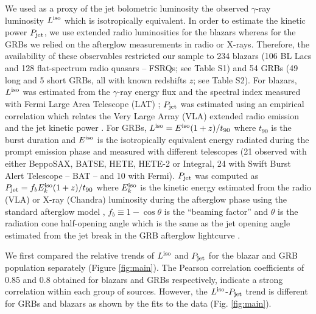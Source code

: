 \documentclass[12pt]{article}
\begin{document}
We used as a proxy of the jet bolometric luminosity the observed $\gamma$-ray luminosity $L^{\rm iso}$ which is isotropically equivalent. In order to estimate the kinetic power $P_{\rm jet}$, we use extended radio luminosities for the blazars whereas for the GRBs we relied on the afterglow measurements in radio or X-rays. Therefore, the availability of these observables restricted our sample to 234 blazars (106 BL Lacs and 128 flat-spectrum radio quasars -- FSRQs; see Table S1) and 54 GRBs (49 long and 5 short GRBs, all with known redshifts $z$; see Table S2). 
For blazars, $L^{\rm iso}$ was estimated from the $\gamma$-ray energy flux and the spectral index measured with Fermi Large Area Telescope (LAT) \cite{2lac}; $P_{\rm jet}$ was estimated using an empirical correlation which relates the Very Large Array (VLA) extended radio emission and the jet kinetic power \cite{cava10,meyer11}. 
For GRBs, $L^{\rm iso} = E^{\rm iso}(1+z)/t_{90}$ where $t_{90}$ is the burst duration and $E^{\rm iso}$ is the isotropically equivalent energy radiated during the prompt emission phase and measured with different telescopes (21 observed with either BeppoSAX, BATSE, HETE, HETE-2 or Integral, 24 with Swift Burst Alert Telescope -- BAT -- and 10 with Fermi). $P_{\rm jet}$ was computed as $P_{\rm jet} = f_b E_k^{\rm iso}(1+z)/t_{90}$ where $E_k^{\rm iso}$ is the kinetic energy estimated from the radio (VLA) or X-ray (Chandra) luminosity during the afterglow phase using the standard afterglow model \cite{freedman01}, $f_b \equiv 1-\cos \theta$ is the ``beaming factor'' and $\theta$ is the radiation cone half-opening angle which is the same as the jet opening angle estimated from the jet break in the GRB afterglow lightcurve \cite{online}. 


We first compared the relative trends of $L^{\rm iso}$ and $P_{\rm jet}$ for the blazar and GRB population separately (Figure \ref{fig:main}). The Pearson correlation coefficients of 0.85 and 0.8 obtained for blazars and GRBs respectively, indicate a strong correlation within each group of sources. However, the $L^{\rm iso}$-$P_{\rm jet}$ trend is different for GRBs and blazars as shown by the fits to the data (Fig. \ref{fig:main}). 
\end{document}
